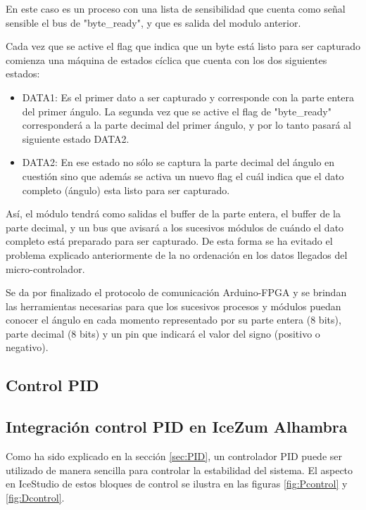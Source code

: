 En este caso es un proceso con una lista de sensibilidad que cuenta como señal sensible el bus de "byte\_ready", y que es salida del modulo anterior. \newline

Cada vez que se active el flag que indica que un byte está listo para ser capturado comienza una máquina de estados cíclica que cuenta con los dos siguientes estados:

\begin{itemize}
	 \item DATA1: Es el primer dato a ser capturado y corresponde con la parte entera del primer ángulo. La segunda vez que se active el flag de "byte\_ready" corresponderá a la parte decimal del primer ángulo, y por lo tanto pasará al siguiente estado DATA2.
	 \item DATA2: En ese estado no sólo se captura la parte decimal del ángulo en cuestión sino que además se activa un nuevo flag el cuál indica que el dato completo (ángulo) esta listo para ser capturado. 
\end{itemize}

Así, el módulo tendrá como salidas el buffer de la parte entera, el buffer de la parte decimal, y un bus que avisará a los sucesivos módulos de cuándo el dato completo está preparado para ser capturado. De esta forma se ha evitado el problema explicado anteriormente de la no ordenación en los datos llegados del micro-controlador.  \newline

Se da por finalizado el protocolo de comunicación Arduino-FPGA y se brindan las herramientas necesarias para que los sucesivos procesos y módulos puedan conocer el ángulo en cada momento representado por su parte entera (8 bits), parte decimal (8 bits) y un pin que indicará el valor del signo (positivo o negativo).




\subsection{Control PID}
\subsection{Integración control PID en IceZum Alhambra}
Como ha sido explicado en la sección \ref{sec:PID}, un controlador PID puede ser utilizado de manera sencilla para controlar la estabilidad del sistema. \newline
El aspecto en IceStudio de estos bloques de control se ilustra en las figuras \ref{fig:Pcontrol} y \ref{fig:Dcontrol}.

